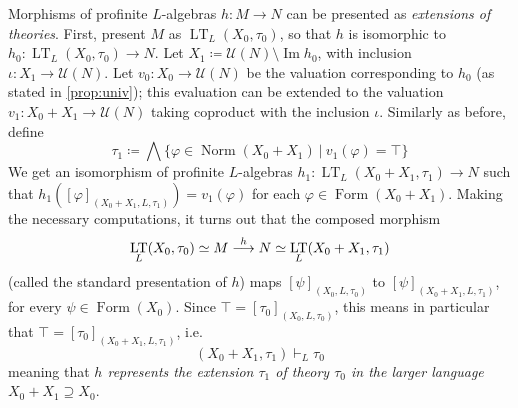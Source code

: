 \documentclass{article}
\theoremstyle{definition}
\DeclareMathOperator{\LT}{LT}
\DeclareMathOperator{\Image}{Im}
\DeclareMathOperator{\Formulas}{Form}
\DeclareMathOperator{\Pro}{Pro-}
\DeclareMathOperator{\Norm}{Norm}
\newcommand{\MA}{\textup{\textbf{MA}}}
\newcommand{\fin}{\textit{fin}}
\newcommand{\Set}{\textup{\textbf{Set}}}
\begin{document}
Morphisms of profinite $L$-algebras $h \colon M \longrightarrow N$ can be presented as \emph{extensions of theories}. First, present $M$ as $\LT_L(X_0,\tau_0)$, so that $h$ is isomorphic to $h_0 \colon \LT_L(X_0,\tau_0) \longrightarrow N$. Let $X_1 \coloneqq \mathcal{U}(N) \setminus \Image h_0$, with inclusion $\iota \colon X_1 \longrightarrow \mathcal{U}(N)$.
Let
$v_0 \colon X_0 \longrightarrow \mathcal{U}(N)$ be the valuation corresponding  to $h_0$ (as stated in \cref{prop:univ}); this evaluation can be extended to the 
valuation $v_1 \colon X_0 + X_1 \longrightarrow \mathcal{U}(N)$
taking coproduct with the inclusion $\iota$. 
Similarly as before, define
$$\tau_1 \coloneqq \bigwedge \{\varphi \in \Norm(X_0+X_1)\ \vert\ v_1(\varphi) = \top\}$$
We get an isomorphism of profinite $L$-algebras $h_1 \colon \LT_L(X_0+X_1,\tau_1) \longrightarrow N$ such that $h_1([\varphi]_{(X_0+X_1,L,\tau_1)}) = v_1(\varphi)$ for each $\varphi \in \Formulas(X_0+X_1)$. 
Making the necessary computations, it turns out that the composed morphism 
$$
\LT_L(X_0, \tau_0) \simeq M \buildrel{h}\over \longrightarrow 
N\simeq \LT_L(X_0+X_1,\tau_1)
$$
(called the standard presentation of $h$) maps $[\psi]_{(X_0,L,\tau_0)}$ to $[\psi]_{(X_0+X_1,L,\tau_1)}$, for every $\psi\in\Formulas(X_0)$. Since $\top=[\tau_0]_{(X_0,L,\tau_0)}$, this means in particular that 
$\top=[\tau_0]_{(X_0+X_1,L,\tau_1)}$, i.e.\ 
$$(X_0+X_1,\tau_1) \vdash_L \tau_0$$
meaning that \emph{$h$ represents the  extension $\tau_1$ of theory $\tau_0$ in the larger language $X_0+X_1\supseteq X_0$}.

\end{document}
